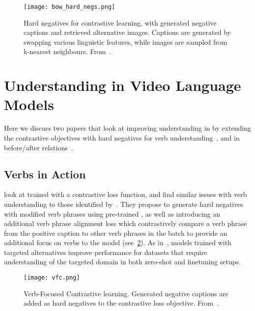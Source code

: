 \begin{figure}[t]
	\centering
	\texttt{[image: bow\_hard\_negs.png]}
	\caption{Hard negatives for contrastive learning, with generated negative
	captions and retrieved alternative images. Captions are generated by
	swapping various linguistic features, while images are sampled from 
	k-nearest neighbours. From~\citet{yuksekgonul2023when}.}
	\label{fig:bow_hard_negs}
\end{figure}


\section{Understanding in Video Language Models}
\label{sec:understandvidlm}

Here we discuss two papers that look at improving understanding in
 by extending the contrastive objectives with hard negatives
for verb understanding~\citep{momeni2023verbs}, and in before/after
relations~\citep{bagad2023testoftime}. 

\subsection{Verbs in Action}
\label{ssec:verbs}
\citet{momeni2023verbs} look at  trained with a contrastive
loss function, and find similar issues with verb understanding to those
identified by~\citet{yuksekgonul2023when}. They propose to generate hard
negatives with modified verb phrases using pre-trained , as well
as introducing an additional verb phrase alignment loss which contrastively
compare a verb phrase from the positive caption to other verb phrases in the
batch to provide an additional focus on verbs to the model
(see~\cref{fig:vfc}). As in~\citet{yuksekgonul2023when}, models trained with
targeted alternatives improve performance for datasets that require
understanding of the targeted domain in both zero-shot and finetuning setups. 

\begin{figure}[t]
	\centering
	\texttt{[image: vfc.png]}
	\caption{Verb-Focused Contrastive learning. Generated negative captions are
	added as hard negatives to the contrastive loss objective.
	From~\citet{momeni2023verbs}.}
	\label{fig:vfc}
\end{figure}



